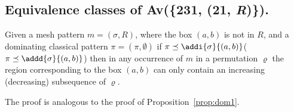 \subsection{Equivalence classes of Av(\{231, (21, \textit{R})\}).}

\begin{lemma}
    Given a mesh pattern \(m =(\sigma, R)\), where the box \((a,b)\) is not
    in \(R\), and a dominating classical pattern \(\pi = (\pi,\emptyset)\) if
    \(\pi \preceq \addi{\sigma}{(a,b)}\)(\(\pi \preceq \addd{\sigma}{(a,b)}\))
    then in any occurrence of \(m\) in a permutation \(\varrho\) the region
    corresponding to the box \((a,b)\) can only contain an increasing
    (decreasing) subsequence of \(\varrho\).
\end{lemma}
The proof is analogous to the proof of Proposition~\ref{prop:dom1}.

